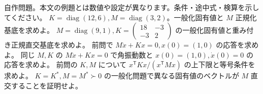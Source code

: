 \documentclass[11pt]{article}
\begin{document}
自作問題。本文の例題とは数値や設定が異なります。条件・途中式・検算を示してください。
\problem[対角の一般化問題]
$K=\operatorname{diag}(12,6),M=\operatorname{diag}(3,2)$。一般化固有値と $M$ 正規化基底を求めよ。
\workspace{45mm}
\problem[結合モード]
$M=\operatorname{diag}(9,1),K=\begin{pmatrix}18&-3\\-3&2\end{pmatrix}$ の一般化固有値と重み付き正規直交基底を求めよ。
\workspace{45mm}
\newpage
\problem[回路の時間応答]
前問で $M\dot x+Kx=0,x(0)=(1,0)$ の応答を求めよ。
\workspace{45mm}
\problem[振動との違い]
同じ $M,K$ の $M\ddot x+Kx=0$ で角振動数と $x(0)=(1,0),\dot x(0)=0$ の応答を求めよ。
\workspace{45mm}
\newpage
\problem[一般化Rayleigh商]
前問の $K,M$ について $x^{\mathsf T}Kx/(x^{\mathsf T}Mx)$ の上下限と等号条件を求めよ。
\workspace{45mm}
\problem[重み付き直交の証明]
$K=K^*,M=M^*\succ0$ の一般化問題で異なる固有値のベクトルが $M$ 直交することを証明せよ。
\workspace{45mm}
\end{document}
